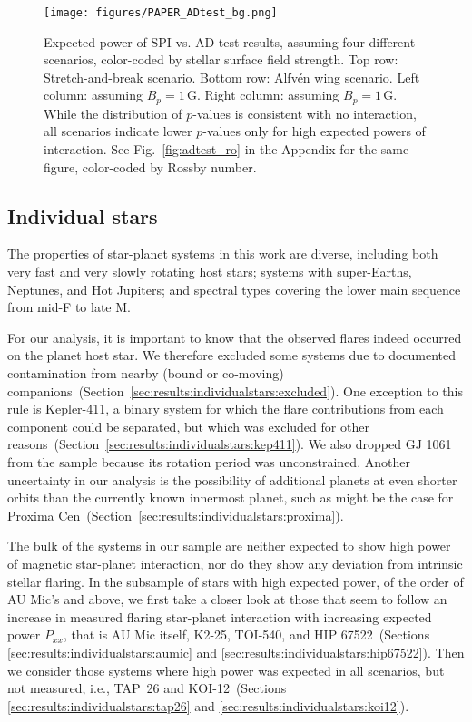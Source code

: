 \documentclass[twocolumn]{aastex631}
\begin{document}
\begin{figure*}[ht!]
    \begin{centering}
        \texttt{[image: figures/PAPER\_ADtest\_bg.png]}
        \caption{
            Expected power of SPI vs. AD test results, assuming four different scenarios, color-coded by stellar surface field strength. Top row: Stretch-and-break scenario. Bottom row: Alfv\'en wing scenario. Left column: assuming $B_p=1\,$G. Right column: assuming $B_p=1\,$G. While the distribution of $p$-values is consistent with no interaction, all scenarios indicate lower $p$-values only for high expected powers of interaction. See Fig.~\ref{fig:adtest_ro} in the Appendix for the same figure, color-coded by Rossby number.
        }
        \label{fig:adtest_bp}
    \end{centering}
\end{figure*}



\subsection{Individual stars}
\label{sec:results:individualstars}
The properties of star-planet systems in this work are diverse, including both very fast and very slowly rotating host stars; systems with super-Earths, Neptunes, and Hot Jupiters; and spectral types covering the lower main sequence from mid-F to late M. 

For our analysis, it is important to know that the observed flares indeed occurred on the planet host star. We therefore excluded some systems due to documented contamination from nearby (bound or co-moving) companions~(Section~\ref{sec:results:individualstars:excluded}). One exception to this rule is Kepler-411, a binary system for which the flare contributions from each component could be separated, but which was excluded for other reasons~(Section~\ref{sec:results:individualstars:kep411}). We also dropped GJ 1061 from the sample because its rotation period was unconstrained. Another uncertainty in our analysis is the possibility of additional planets at even shorter orbits than the currently known innermost planet, such as might be the case for Proxima Cen~(Section~\ref{sec:results:individualstars:proxima}). 

The bulk of the systems in our sample are neither expected to show high power of magnetic star-planet interaction, nor do they show any deviation from intrinsic stellar flaring. In the subsample of stars with high expected power, of the order of AU Mic's and above, we first take a closer look at those that seem to follow an increase in measured flaring star-planet interaction with increasing expected power $P_{xx}$, that is AU Mic itself, K2-25, TOI-540, and HIP 67522~(Sections \ref{sec:results:individualstars:aumic} and \ref{sec:results:individualstars:hip67522}). Then we consider those systems where high power was expected in all scenarios, but not measured, i.e., TAP~26 and KOI-12~(Sections \ref{sec:results:individualstars:tap26} and \ref{sec:results:individualstars:koi12}).
\end{document}
